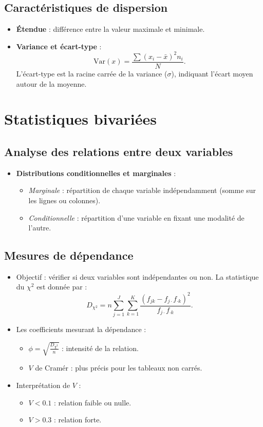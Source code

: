 \documentclass[a4paper,12pt]{article}
\begin{document}
\subsection*{Caractéristiques de dispersion}
\begin{itemize}
    \item \textbf{Étendue} : différence entre la valeur maximale et minimale.
    \item \textbf{Variance et écart-type} :
    \[
    \text{Var}(x) = \frac{\sum (x_i - \bar{x})^2 n_i}{N}.
    \]
    L’écart-type est la racine carrée de la variance ($\sigma$), indiquant l’écart moyen autour de la moyenne.
\end{itemize}

\section*{Statistiques bivariées}

\subsection*{Analyse des relations entre deux variables}
\begin{itemize}
    \item \textbf{Distributions conditionnelles et marginales} :
    \begin{itemize}
        \item \textit{Marginale} : répartition de chaque variable indépendamment (somme sur les lignes ou colonnes).
        \item \textit{Conditionnelle} : répartition d’une variable en fixant une modalité de l’autre.
    \end{itemize}
\end{itemize}

\subsection*{Mesures de dépendance}
\begin{itemize}
    \item Objectif : vérifier si deux variables sont indépendantes ou non. La statistique du $\chi^2$ est donnée par :
    \[
    D_{\chi^2} = n \sum_{j=1}^J \sum_{k=1}^K \frac{(f_{jk} - f_{j\cdot} f_{\cdot k})^2}{f_{j\cdot} f_{\cdot k}}.
    \]
    \item Les coefficients mesurant la dépendance :
    \begin{itemize}
        \item $\phi = \sqrt{\frac{D_{\chi^2}}{n}}$ : intensité de la relation.
        \item $V$ de Cramér : plus précis pour les tableaux non carrés.
    \end{itemize}
    \item Interprétation de $V$ :
    \begin{itemize}
        \item $V < 0.1$ : relation faible ou nulle.
        \item $V > 0.3$ : relation forte.
    \end{itemize}
\end{itemize}
\end{document}
